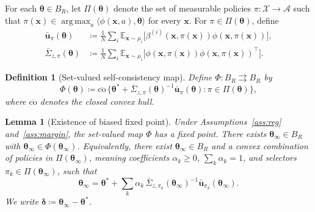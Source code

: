 \documentclass[11pt]{article}
\newtheorem{lemma}[theorem]{Lemma}
\newtheorem{definition}[theorem]{Definition}
\DeclareMathOperator*{\argmax}{arg\,max}
\begin{document}
For each $\bm{\theta}\in B_R$, let $\Pi(\bm{\theta})$ denote the set of
measurable policies $\pi:\mathcal{X}\to\mathcal{A}$ such that
$\pi(\bm{x})\in\argmax_a\langle\phi(\bm{x},a),\bm{\theta}\rangle$
for every $\bm{x}$.  For $\pi\in\Pi(\bm{\theta})$, define
\begin{align*}
\bar{\bm{u}}_\pi(\bm{\theta})&\coloneqq
\tfrac{1}{N}\sum_i\mathbb{E}_{\bm{x}\sim\mu_i}
\bigl[\beta^{(i)}(\bm{x},\pi(\bm{x}))\phi(\bm{x},\pi(\bm{x}))\bigr],\\
\bar{\Sigma}_{z,\pi}(\bm{\theta})&\coloneqq
\tfrac{1}{N}\sum_i\mathbb{E}_{\bm{x}\sim\mu_i}
\bigl[\phi(\bm{x},\pi(\bm{x}))\phi(\bm{x},\pi(\bm{x}))^\top\bigr].
\end{align*}

\begin{definition}[Set-valued self-consistency map]\label{def:Phi}
Define $\Phi:B_R\rightrightarrows B_R$ by
\[
\Phi(\bm{\theta})\coloneqq
\overline{\mathrm{co}}\,\bigl\{
\bm{\theta}^{\!*}+\bar{\Sigma}_{z,\pi}(\bm{\theta})^{-1}
\bar{\bm{u}}_\pi(\bm{\theta}):\pi\in\Pi(\bm{\theta})\bigr\},
\]
where $\overline{\mathrm{co}}$ denotes the closed convex hull.
\end{definition}

\begin{lemma}[Existence of biased fixed point]\label{lem:fp}
Under Assumptions~\ref{ass:reg} and~\ref{ass:margin}, the set-valued
map $\Phi$ has a fixed point. There exists $\bm{\theta}_\infty\in B_R$
with $\bm{\theta}_\infty\in\Phi(\bm{\theta}_\infty)$.
Equivalently, there exist $\bm{\theta}_\infty\in B_R$ and a
\emph{convex combination} of policies in $\Pi(\bm{\theta}_\infty)$, meaning coefficients $\alpha_k\geq 0$, $\sum_k\alpha_k=1$, and
selectors $\pi_k\in\Pi(\bm{\theta}_\infty)$, such that
\begin{equation}
\bm{\theta}_\infty=\bm{\theta}^{\!*}+
\sum_k\alpha_k\,\bar{\Sigma}_{z,\pi_k}(\bm{\theta}_\infty)^{-1}
\bar{\bm{u}}_{\pi_k}(\bm{\theta}_\infty).
\label{eq:fp_conv}
\end{equation}
We write $\bm{\delta}\coloneqq\bm{\theta}_\infty-\bm{\theta}^{\!*}$.
\end{lemma}
\end{document}
